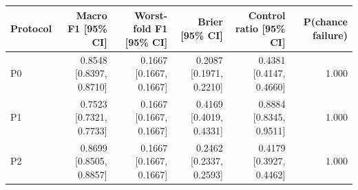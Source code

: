 \begin{tabular}{lrrrrr}
\hline
Protocol & Macro F1 [95\% CI] & Worst-fold F1 [95\% CI] & Brier [95\% CI] & Control ratio [95\% CI] & P(chance failure) \\
\hline
P0 & 0.8548 [0.8397, 0.8710] & 0.1667 [0.1667, 0.1667] & 0.2087 [0.1971, 0.2210] & 0.4381 [0.4147, 0.4660] & 1.000 \\
P1 & 0.7523 [0.7321, 0.7733] & 0.1667 [0.1667, 0.1667] & 0.4169 [0.4019, 0.4331] & 0.8884 [0.8345, 0.9511] & 1.000 \\
P2 & 0.8699 [0.8505, 0.8857] & 0.1667 [0.1667, 0.1667] & 0.2462 [0.2337, 0.2593] & 0.4179 [0.3927, 0.4462] & 1.000 \\
\hline
\end{tabular}
